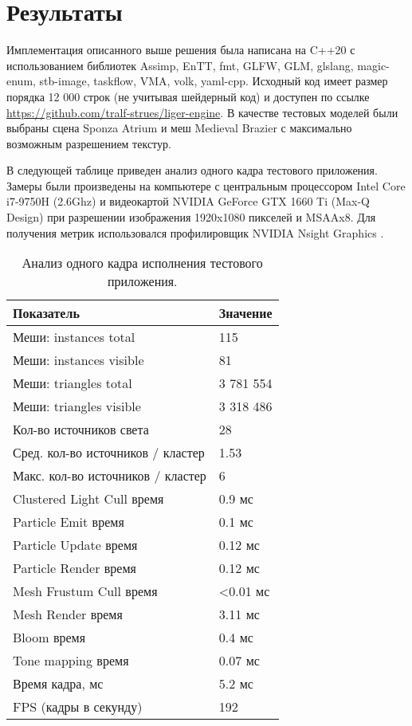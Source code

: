 \section{Результаты}
Имплементация описанного выше решения была написана на C++20 с использованием библиотек Assimp, EnTT, fmt, GLFW, GLM, glslang, magic-enum, stb-image, taskflow, VMA, volk, yaml-cpp. Исходный код имеет размер порядка 12 000 строк (не учитывая шейдерный код) и доступен по ссылке \url{https://github.com/tralf-strues/liger-engine}. В качестве тестовых моделей были выбраны сцена Sponza Atrium \cite{sponza_atrium} и меш Medieval Brazier \cite{medieval_brazier} с максимально возможным разрешением текстур.

В следующей таблице приведен анализ одного кадра тестового приложения. Замеры были произведены на компьютере с центральным процессором Intel Core i7-9750H (2.6Ghz) и видеокартой NVIDIA GeForce GTX 1660 Ti (Max-Q Design) при разрешении изображения 1920x1080 пикселей и MSAAx8. Для получения метрик использовался профилировщик NVIDIA Nsight Graphics \cite{nsight}.

\begin{table}[ht]
    \centering
    \begin{tabular}{ p{70mm} | p{30mm} }
    \textbf{Показатель} & \textbf{Значение} \\
    \hline
    \hline
    Меши: instances total & 115 \\
    Меши: instances visible & 81 \\
    Меши: triangles total & 3 781 554 \\
    Меши: triangles visible & 3 318 486 \\
    \hline
    Кол-во источников света & 28 \\
    Сред. кол-во источников / кластер & 1.53 \\
    Макс. кол-во источников / кластер & 6 \\
    \hline
    \hline
    Clustered Light Cull время & 0.9 мс \\
    \hline
    Particle Emit время & 0.1 мс \\
    Particle Update время & 0.12 мс \\
    Particle Render время & 0.12 мс \\
    \hline
    Mesh Frustum Cull время & <0.01 мс \\
    Mesh Render время & 3.11 мс \\
    \hline
    Bloom время & 0.4 мс \\
    Tone mapping время & 0.07 мс \\
    \hline
    \hline
    Время кадра, мс & 5.2 мс \\
    FPS (кадры в секунду) & 192 \\
    \end{tabular}
    \caption{Анализ одного кадра исполнения тестового приложения.}
    \label{tbl:frame_stats}
\end{table}

